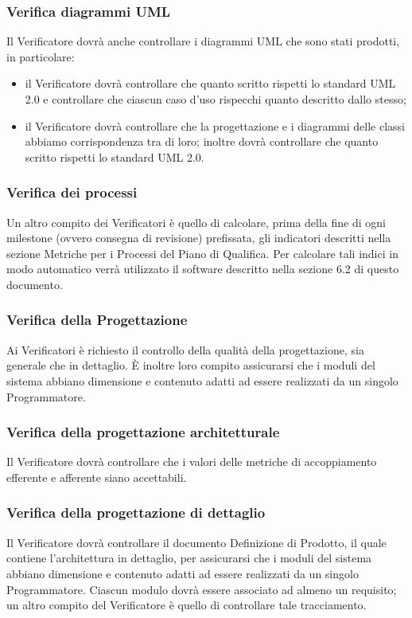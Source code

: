 \subsubsection{Verifica diagrammi UML}
Il Verificatore dovrà anche controllare i diagrammi UML che sono stati prodotti, in particolare:
\begin{itemize}
\item {} il Verificatore dovrà controllare che quanto scritto rispetti lo standard UML 2.0 e controllare che ciascun caso d'uso rispecchi quanto descritto dallo stesso;
\item {} il Verificatore dovrà controllare che la progettazione e i diagrammi delle classi abbiamo corrispondenza tra di loro; inoltre dovrà controllare che quanto scritto rispetti lo standard UML 2.0.
\end{itemize}

\subsubsection{Verifica dei processi}
Un altro compito dei Verificatori è quello di calcolare, prima della fine di ogni milestone (ovvero consegna di revisione) prefissata, gli indicatori descritti nella sezione Metriche per i Processi del Piano di Qualifica. Per calcolare tali indici in modo automatico verrà utilizzato il software descritto nella sezione 6.2 di questo documento.

\subsubsection{Verifica della Progettazione}
\label{}
Ai Verificatori è richiesto il controllo della qualità della progettazione, sia generale che in dettaglio.
È inoltre loro compito assicurarsi che i moduli del sistema abbiano dimensione e contenuto adatti ad essere realizzati da un singolo Programmatore.

\subsubsection{Verifica della progettazione architetturale}
Il Verificatore dovrà controllare che i valori delle metriche di accoppiamento efferente e afferente siano accettabili.

\subsubsection{Verifica della progettazione di dettaglio}
Il Verificatore dovrà controllare il documento Definizione di Prodotto, il quale contiene l'architettura in dettaglio, per assicurarsi che i moduli del sistema abbiano dimensione e contenuto adatti ad essere realizzati da un singolo Programmatore.
Ciascun modulo dovrà essere associato ad almeno un requisito; un altro compito del Verificatore è quello di controllare tale tracciamento.

